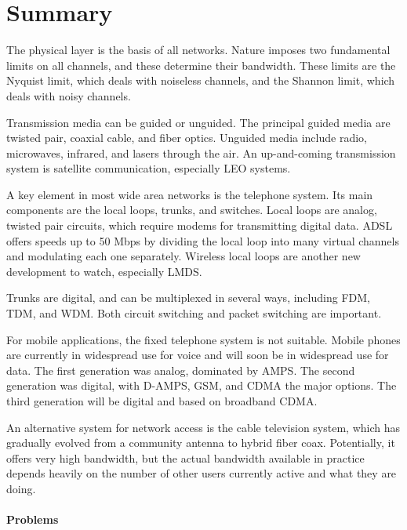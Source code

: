 \documentclass[b5paper,11pt]{memoir}
\begin{document}
\section{Summary}

The physical layer is the basis of all networks. Nature imposes two
fundamental limits on all channels, and these determine their bandwidth.
These limits are the Nyquist limit, which deals with noiseless channels,
and the Shannon limit, which deals with noisy channels.

Transmission media can be guided or unguided. The principal guided media
are twisted pair, coaxial cable, and fiber optics. Unguided media
include radio, microwaves, infrared, and lasers through the air. An
up-and-coming transmission system is satellite communication, especially
LEO systems.

A key element in most wide area networks is the telephone system. Its
main components are the local loops, trunks, and switches. Local loops
are analog, twisted pair circuits, which require modems for transmitting
digital data. ADSL offers speeds up to 50 Mbps by dividing the local
loop into many virtual channels and modulating each one separately.
Wireless local loops are another new development to watch, especially
LMDS.

Trunks are digital, and can be multiplexed in several ways, including
FDM, TDM, and WDM. Both circuit switching and packet switching are
important.

For mobile applications, the fixed telephone system is not suitable.
Mobile phones are currently in widespread use for voice and will soon be
in widespread use for data. The first generation was analog, dominated
by AMPS. The second generation was digital, with D-AMPS, GSM, and CDMA
the major options. The third generation will be digital and based on
broadband CDMA.

An alternative system for network access is the cable television system,
which has gradually evolved from a community antenna to hybrid fiber
coax. Potentially, it offers very high bandwidth, but the actual
bandwidth available in practice depends heavily on the number of other
users currently active and what they are doing.

\protect\hypertarget{0130661023_ch02lev1sec8.htmlux5cux23ch02lev2sec30}{}{}

\paragraph{Problems}
\end{document}
